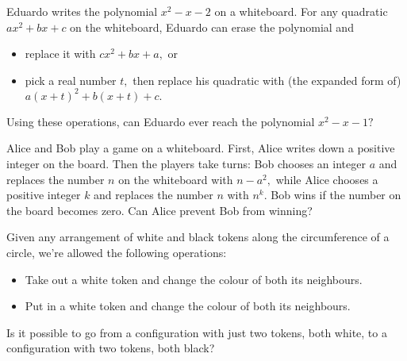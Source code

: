 \documentclass[mast]{lucky}
\begin{document}
\begin{prob}{6}
Eduardo writes the polynomial $x^2-x-2$ on a whiteboard. For any quadratic $ax^2+bx+c$ on the whiteboard, Eduardo can erase the polynomial and
\begin{itemize}
        \item replace it with $cx^2 + bx + a,$ or
        
        \item pick a real number $t,$ then replace his quadratic with (the expanded form of)
$a(x + t)^2 + b(x + t) + c.$
\end{itemize}

Using these operations, can Eduardo ever reach the polynomial $x^2 - x - 1?$
\end{prob}

\begin{req}[RMM 2019/1]{6}
Alice and Bob play a game on a whiteboard. First, Alice writes down a positive integer on the board. Then the players take turns: Bob chooses an integer $a$ and replaces the number $n$ on the whiteboard with $n-a^2,$ while Alice chooses a positive integer $k$ and replaces the number $n$ with $n^k.$ Bob wins if the number on the board becomes zero. Can Alice prevent Bob from winning?
\end{req}

\begin{prob}[]{9}
Given any arrangement of white and black tokens along the circumference of a circle, we're allowed the following operations:
    \begin{itemize}
        \item Take out a white token and change the colour of both its neighbours.
        
        \item Put in a white token and change the colour of both its neighbours.
    \end{itemize}
    Is it possible to go from a configuration with just two tokens, both white, to a configuration with two tokens, both black?
\end{prob}
    
\end{document}
